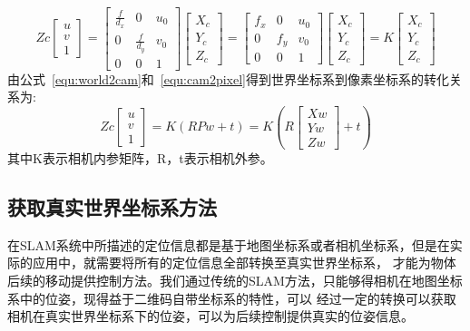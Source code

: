 \begin{equation}
Z c\left[\begin{array}{l}{u} \\ {v} \\ {1}\end{array}\right]=\left[\begin{array}{ccc}{\frac{f}{d_{x}}} & {0} & {u_{0}} \\ {0} & {\frac{f}{d_{y}}} & {v_{0}} \\ {0} & {0} & {1}\end{array}\right]\left[\begin{array}{c}{X_{c}} \\ {Y_{c}} \\ {Z_{c}}\end{array}\right]=\left[\begin{array}{ccc}{f_{x}} & {0} & {u_{0}} \\ {0} & {f_{y}} & {v_{0}} \\ {0} & {0} & {1}\end{array}\right]\left[\begin{array}{c}{X_{c}} \\ {Y_{c}} \\ {Z_{c}}\end{array}\right]=K\left[\begin{array}{c}{X_{c}} \\ {Y_{c}} \\ {Z_{c}}\end{array}\right]
  \label{equ:cam2pixel}
\end{equation}
由公式~\ref{equ:world2cam}和~\ref{equ:cam2pixel}得到世界坐标系到像素坐标系的转化关系为:
\begin{equation}
Z c\left[\begin{array}{l}{u} \\ {v} \\ {1}\end{array}\right]=K(R P w+t)=K\left(R\left[\begin{array}{l}{X w} \\ {Y w} \\ {Z w}\end{array}\right]+t\right)
\end{equation}
其中K表示相机内参矩阵，R，t表示相机外参。
\subsection{获取真实世界坐标系方法}
\label{sec:2.4.2}
在SLAM系统中所描述的定位信息都是基于地图坐标系或者相机坐标系，但是在实际的应用中，就需要将所有的定位信息全部转换至真实世界坐标系，
才能为物体后续的移动提供控制方法。我们通过传统的SLAM方法，只能够得相机在地图坐标系中的位姿，现得益于二维码自带坐标系的特性，可以
经过一定的转换可以获取相机在真实世界坐标系下的位姿，可以为后续控制提供真实的位姿信息。

